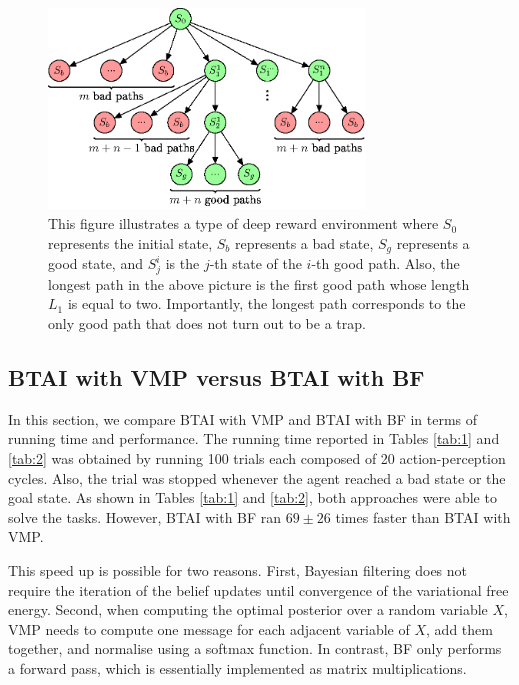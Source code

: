 \documentclass[twoside,11pt]{article}
\providecommand{\DIFadd}[1]{{\protect\color{blue}\uwave{#1}}} %
\providecommand{\DIFdel}[1]{{\protect\color{red}\sout{#1}}}                      %
\providecommand{\DIFaddbegin}{} %
\providecommand{\DIFaddend}{} %
\providecommand{\DIFdelbegin}{} %
\providecommand{\DIFdelend}{} %
\begin{document}
\begin{figure}[H]
	\begin{center}
	\includegraphics[width=0.75\textwidth]{BTAI_BF-figure1.eps}
 	\end{center}
\vspace{-0.25cm}
    \caption{
This figure illustrates a type of deep reward environment where $S_0$ represents the initial state, $S_b$ represents a bad state, $S_g$ represents a good state, and $S^i_j$ is the $j$-th state of the $i$-th good path. Also, the longest path in the above picture is the first good path whose length $L_1$ is equal to two. Importantly, the longest path corresponds to the only good path that does not turn out to be a trap.}
    \label{fig:graph_env}
\end{figure}

\subsection{BTAI with VMP versus BTAI with BF}

In this section, we compare BTAI with VMP and BTAI with BF in terms of running time and performance. The running time reported in Tables \ref{tab:1} and \ref{tab:2} was obtained by running 100 trials each composed of 20 action-perception cycles. Also, the trial was stopped whenever the agent reached a bad state or the goal state. As shown in Tables \ref{tab:1} and \ref{tab:2}, both approaches were able to solve the tasks. However, BTAI with BF ran \DIFdelbegin \DIFdel{$69 \pm 26$ }\DIFdelend \DIFaddbegin \DIFadd{around forty }\DIFaddend times faster than BTAI with VMP.

This speed up is possible for two reasons. First, Bayesian filtering does not require the iteration of the belief updates until convergence of the variational free energy. Second, when computing the optimal posterior over a random variable $X$, VMP needs to compute one message for each adjacent variable of $X$, add them together, and normalise using a softmax function. In contrast, BF only performs a forward pass, which is essentially implemented as matrix multiplications. 
\end{document}
